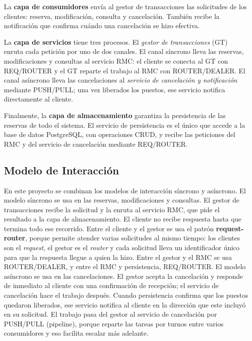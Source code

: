 \documentclass[10pt, a4paper]{article}
\begin{document}
	La \textbf{capa de consumidores} envía al gestor de transacciones las solicitudes de los clientes: reserva, modificación, consulta y cancelación. También recibe la notificación que confirma cuándo una cancelación se hizo efectiva.
	
	La \textbf{capa de servicios} tiene tres procesos. El \textit{gestor de transacciones} (GT) enruta cada petición por uno de dos canales. El canal síncrono lleva las reservas, modificaciones y consultas al servicio RMC: el cliente se conecta al GT con REQ/ROUTER y el GT reparte el trabajo al RMC con ROUTER/DEALER. El canal asíncrono lleva las cancelaciones al \textit{servicio de cancelación y notificación} mediante PUSH/PULL; una vez liberados los puestos, ese servicio notifica directamente al cliente.
	
	Finalmente, la \textbf{capa de almacenamiento} garantiza la persistencia de las reservas de todo el sistema. El servicio de persistencia es el único que accede a la base de datos PostgreSQL, con operaciones CRUD, y recibe las peticiones del RMC y del servicio de cancelación mediante REQ/ROUTER.
	
	
	\subsection{Modelo de Interacción}
	\label{sec:models_exch}
	
	En este proyecto se combinan los modelos de interacción síncrono y asíncrono.
	El modelo síncrono se usa en las reservas, modificaciones y consultas. El gestor de transacciones recibe la solicitud y la enruta al servicio RMC, que pide el resultado a la capa de almacenamiento. El cliente no recibe respuesta hasta que termina todo ese recorrido. Entre el cliente y el gestor se usa el patrón \textbf{request-router}, porque permite atender varias solicitudes al mismo tiempo: los clientes son el \textit{request}, el gestor es el \textit{router} y cada solicitud lleva un identificador único para que la respuesta llegue a quien la hizo. Entre el gestor y el RMC se usa ROUTER/DEALER, y entre el RMC y persistencia, REQ/ROUTER.
	El modelo asíncrono se usa en las cancelaciones. El gestor acepta la cancelación y responde de inmediato al cliente con una confirmación de recepción; el servicio de cancelación hace el trabajo después. Cuando persistencia confirma que los puestos quedaron liberados, ese servicio notifica al cliente en la dirección que este incluyó en su solicitud. El trabajo pasa del gestor al servicio de cancelación por PUSH/PULL (pipeline), porque reparte las tareas por turnos entre varios consumidores y eso facilita escalar más adelante.
	
\end{document}
